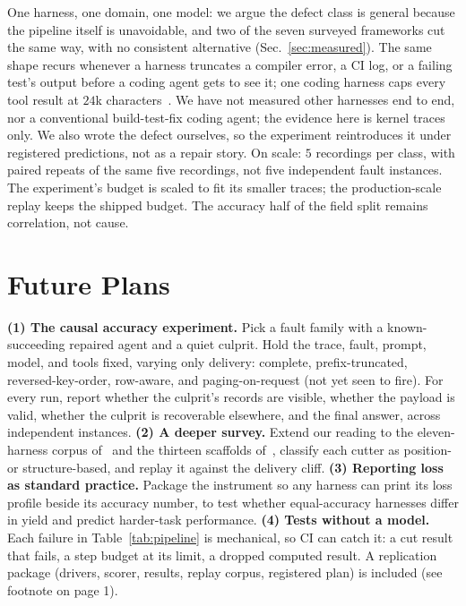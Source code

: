 \documentclass[10pt,conference]{IEEEtran}
\begin{document}
One harness, one domain, one model: we argue the defect class is
general because the pipeline itself is unavoidable, and two of the
seven surveyed frameworks cut the same way, with no consistent
alternative (Sec.~\ref{sec:measured}). The same shape recurs whenever a harness
truncates a compiler error, a CI log, or a failing test's output before a coding agent gets to see it; one coding harness caps every tool
result at $24$k characters~\cite{fan2026harnessdesign}. We have not measured other harnesses end to
end, nor a conventional build-test-fix coding agent; the evidence here
is kernel traces only. We also wrote the defect ourselves, so the
experiment reintroduces it under registered predictions, not as a repair
story. On scale: $5$ recordings per class, with paired repeats of the
same five recordings, not five independent fault instances. The
experiment's budget is scaled to fit its smaller traces; the
production-scale replay keeps the shipped budget. The accuracy half of
the field split remains correlation, not cause.

\section{Future Plans}

\textbf{(1) The causal accuracy experiment.} Pick a fault family with a
known-succeeding repaired agent and a quiet culprit. Hold the trace,
fault, prompt, model, and tools fixed, varying only delivery: complete,
prefix-truncated, reversed-key-order, row-aware, and paging-on-request
(not yet seen to fire). For every run, report whether the culprit's
records are visible, whether the payload is valid, whether the culprit
is recoverable elsewhere, and the final answer, across independent
instances.
\textbf{(2) A deeper survey.} Extend our reading to the eleven-harness
corpus of~\cite{harness2026} and the thirteen scaffolds
of~\cite{rombaut2026scaffold}, classify each cutter as position- or
structure-based, and replay it against the delivery cliff.
\textbf{(3) Reporting loss as standard practice.}
Package the instrument so any harness can print its loss profile beside
its accuracy number, to test whether equal-accuracy harnesses differ in
yield and predict harder-task performance.
\textbf{(4) Tests without a model.} Each failure in Table~\ref{tab:pipeline}
is mechanical, so CI can catch it: a cut result that fails, a step
budget at its limit, a dropped computed result. A replication package
(drivers, scorer, results, replay corpus, registered plan) is included
(see footnote on page 1).
\end{document}
